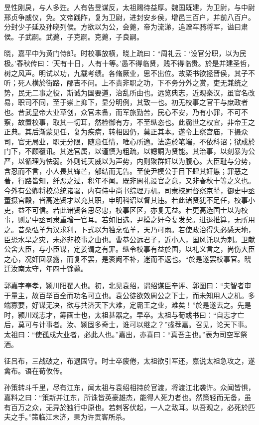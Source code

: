 \documentclass[12pt,UTF8]{ctexbook}
\begin{document}
昱性刚戾，与人多迕。人有告昱谋反，太祖赐待益厚。魏国既建，为卫尉，与中尉邢贞争威仪，免。文帝践阼，复为卫尉，进封安乡侯，增邑三百户，并前八百户。分封少子延及孙晓列侯。方欲以为公，会薨，帝为流涕，追赠车骑将军，谥曰肃侯。子武嗣。武薨，子克嗣。克薨，子良嗣。

晓，嘉平中为黄门侍郎。时校事放横，晓上疏曰：“周礼云：‘设官分职，以为民极。’春秋传曰：‘天有十日，人有十等。’愚不得临贤，贱不得临贵。於是并建圣哲，树之风声。明试以功，九载考绩。各脩厥业，思不出位。故栾书欲拯晋侯，其子不听；死人横於街路，邴吉不问。上不责非职之功，下不务分外之赏，吏无兼统之势，民无二事之役，斯诚为国要道，治乱所由也。远览典志，近观秦汉，虽官名改易，职司不同，至于崇上抑下，显分明例，其致一也。初无校事之官干与庶政者也。昔武皇帝大业草创，众官未备，而军旅勤苦，民心不安，乃有小罪，不可不察，故置校事，取其一切耳，然检御有方，不至纵恣也。此霸世之权宜，非帝王之正典。其后渐蒙见任，复为疾病，转相因仍，莫正其本。遂令上察宫庙，下摄众司，官无局业，职无分限，随意任情，唯心所適。法造於笔端，不依科诏；狱成於门下，不顾覆讯。其选官属，以谨慎为粗疏，以謥詷为贤能。其治事，以刻暴为公严，以循理为怯弱。外则讬天威以为声势，内则聚群奸以为腹心。大臣耻与分势，含忍而不言，小人畏其锋芒，郁结而无告。至使尹模公于目下肆其奸慝；罪恶之著，行路皆知，纤恶之过，积年不闻。既非周礼设官之意，又非春秋十等之义也。今外有公卿将校总统诸署，内有侍中尚书综理万机，司隶校尉督察京辇，御史中丞董摄宫殿，皆高选贤才以充其职，申明科诏以督其违。若此诸贤犹不足任，校事小吏，益不可信。若此诸贤各思尽忠，校事区区，亦复无益。若更高选国士以为校事，则是中丞司隶重增一官耳。若如旧选，尹模之奸今复发矣。进退推算，无所用之。昔桑弘羊为汉求利，卜式以为独烹弘羊，天乃可雨。若使政治得失必感天地，臣恐水旱之灾，未必非校事之由也。曹恭公远君子，近小人，国风讬以为刺。卫献公舍大臣，与小臣谋，定姜谓之有罪。纵令校事有益於国，以礼义言之，尚伤大臣之心，况奸回暴露，而复不罢，是衮阙不补，迷而不返也。“於是遂罢校事官。晓迁汝南太守，年四十馀薨。

郭嘉字奉孝，颍川阳翟人也。初，北见袁绍，谓绍谋臣辛评、郭图曰：“夫智者审于量主，故百举百全而功名可立也。袁公徒欲效周公之下士，而未知用人之机。多端寡要，好谋无决，欲与共济天下大难，定霸王之业，难矣！”於是遂去之。先是时，颍川戏志才，筹画士也，太祖甚器之。早卒。太祖与荀彧书曰：“自志才亡后，莫可与计事者。汝、颍固多奇士，谁可以继之？”彧荐嘉。召见，论天下事。太祖曰：“使孤成大业者，必此人也。”嘉出，亦喜曰：“真吾主也。”表为司空军祭酒。

征吕布，三战破之，布退固守。时士卒疲倦，太祖欲引军还，嘉说太祖急攻之，遂禽布。语在荀攸传。

孙策转斗千里，尽有江东，闻太祖与袁绍相持於官渡，将渡江北袭许。众闻皆惧，嘉料之曰：“策新并江东，所诛皆英豪雄杰，能得人死力者也。然策轻而无备，虽有百万之众，无异於独行中原也。若刺客伏起，一人之敌耳。以吾观之，必死於匹夫之手。”策临江未济，果为许贡客所杀。
\end{document}
